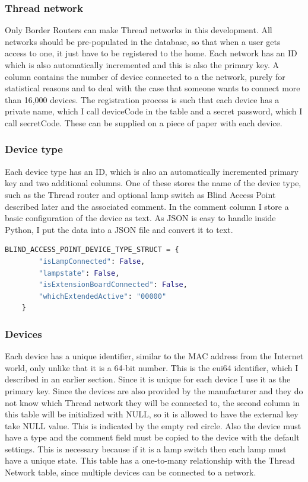 \subsubsection{Thread network}
Only Border Routers can make Thread networks in this development. All networks should be pre-populated in the database, so that when a user gets access to one, it just have to be registered to the home. Each network has an ID which is also automatically incremented and this is also the primary key. A column contains the number of device connected to a the network, purely for statistical reasons and to deal with the case that someone wants to connect more than 16,000 devices. The registration process is such that each device has a private name, which I call deviceCode in the table and a secret password, which I call secretCode. These can be supplied on a piece of paper with each device.


\subsubsection{Device type}
Each device type has an ID, which is also an automatically incremented primary key and two additional columns. One of these stores the name of the device type, such as the Thread router and optional lamp switch as Blind Access Point described later and the associated comment. In the comment column I store a basic configuration of the device as text. As JSON is easy to handle inside Python, I put the data into a JSON file and convert it to text.
\begin{lstlisting}[language=Python]
    BLIND_ACCESS_POINT_DEVICE_TYPE_STRUCT = {
        "isLampConnected": False,
        "lampstate": False,
        "isExtensionBoardConnected": False,
        "whichExtendedActive": "00000"
    }
\end{lstlisting}

\subsubsection{Devices}
Each device has a unique identifier, similar to the MAC address from the Internet world, only unlike that it is a 64-bit number. This is the eui64 identifier, which I described in an earlier section. Since it is unique for each device I use it as the primary key. Since the devices are also provided by the manufacturer and they do not know which Thread network they will be connected to, the second column in this table will be initialized with NULL, so it is allowed to have the external key take NULL value. This is indicated by the empty red circle. Also the device must have a type and the comment field must be copied to the device with the default settings. This is necessary because if it is a lamp switch then each lamp must have a unique state. This table has a one-to-many relationship with the Thread Network table, since multiple devices can be connected to a network.


